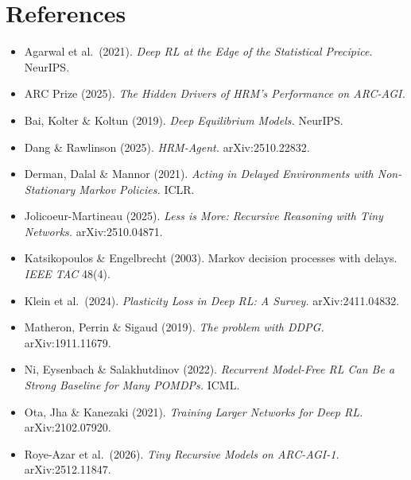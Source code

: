 \documentclass[11pt]{article}
\begin{document}
\section*{References}
\small
\begin{itemize}[leftmargin=*,label={}]
  \item Agarwal et al.\ (2021). \emph{Deep RL at the Edge of the Statistical Precipice.} NeurIPS.
  \item ARC Prize (2025). \emph{The Hidden Drivers of HRM's Performance on ARC-AGI.}
  \item Bai, Kolter \& Koltun (2019). \emph{Deep Equilibrium Models.} NeurIPS.
  \item Dang \& Rawlinson (2025). \emph{HRM-Agent.} arXiv:2510.22832.
  \item Derman, Dalal \& Mannor (2021). \emph{Acting in Delayed Environments with Non-Stationary Markov Policies.} ICLR.
  \item Jolicoeur-Martineau (2025). \emph{Less is More: Recursive Reasoning with Tiny Networks.} arXiv:2510.04871.
  \item Katsikopoulos \& Engelbrecht (2003). Markov decision processes with delays. \emph{IEEE TAC} 48(4).
  \item Klein et al.\ (2024). \emph{Plasticity Loss in Deep RL: A Survey.} arXiv:2411.04832.
  \item Matheron, Perrin \& Sigaud (2019). \emph{The problem with DDPG.} arXiv:1911.11679.
  \item Ni, Eysenbach \& Salakhutdinov (2022). \emph{Recurrent Model-Free RL Can Be a Strong Baseline for Many POMDPs.} ICML.
  \item Ota, Jha \& Kanezaki (2021). \emph{Training Larger Networks for Deep RL.} arXiv:2102.07920.
  \item Roye-Azar et al.\ (2026). \emph{Tiny Recursive Models on ARC-AGI-1.} arXiv:2512.11847.
\end{itemize}
\end{document}
